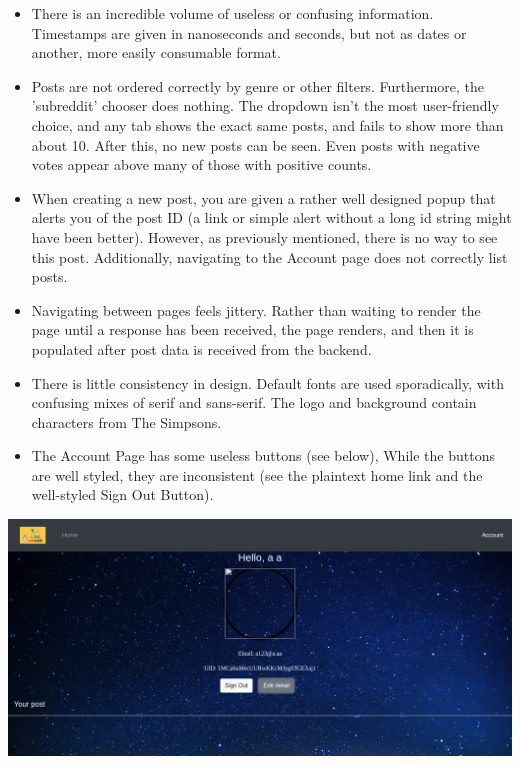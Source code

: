 \begin{itemize}
    \item There is an incredible volume of useless or confusing information. Timestamps are given in nanoseconds and seconds, but not as dates or another, more easily consumable format.
    \item Posts are not ordered correctly by genre or other filters. Furthermore, the 'subreddit' chooser does nothing. The dropdown isn't the most user-friendly choice, and any tab shows the exact same posts, and fails to show more than about 10. After this, no new posts can be seen. Even posts with negative votes appear above many of those with positive counts.
    \item When creating a new post, you are given a rather well designed popup that alerts you of the post ID (a link or simple alert without a long id string might have been better). However, as previously mentioned, there is no way to see this post. Additionally, navigating to the Account page does not correctly list posts.
    \item Navigating between pages feels jittery. Rather than waiting to render the page until a response has been received, the page renders, and then it is populated after post data is received from the backend.
    \item There is little consistency in design. Default fonts are used sporadically, with confusing mixes of serif and sans-serif. The logo and background contain characters from The Simpsons.
    \item The Account Page has some useless buttons (see below), While the buttons are well styled, they are inconsistent (see the plaintext home link and the well-styled Sign Out Button).
\end{itemize}
\includegraphics[width = 400pt]{images/account.png}
